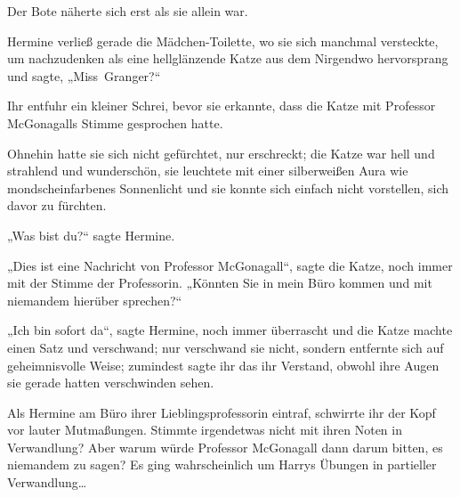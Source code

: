 
Der Bote näherte sich erst als sie allein war.

Hermine verließ gerade die Mädchen-Toilette, wo sie sich manchmal versteckte, um nachzudenken als eine hellglänzende Katze aus dem Nirgendwo hervorsprang und sagte, „Miss~Granger?“

Ihr entfuhr ein kleiner Schrei, bevor sie erkannte, dass die Katze mit Professor McGonagalls Stimme gesprochen hatte.

Ohnehin hatte sie sich nicht gefürchtet, nur erschreckt; die Katze war hell und strahlend und wunderschön, sie leuchtete mit einer silberweißen Aura wie mondscheinfarbenes Sonnenlicht und sie konnte sich einfach nicht vorstellen, sich davor zu fürchten.

„Was bist du?“ sagte Hermine.

„Dies ist eine Nachricht von Professor McGonagall“, sagte die Katze, noch immer mit der Stimme der Professorin. „Könnten Sie in mein Büro kommen und mit niemandem hierüber sprechen?“

„Ich bin sofort da“, sagte Hermine, noch immer überrascht und die Katze machte einen Satz und verschwand; nur verschwand sie nicht, sondern entfernte sich auf geheimnisvolle Weise; zumindest sagte ihr das ihr Verstand, obwohl ihre Augen sie gerade hatten verschwinden sehen.

Als Hermine am Büro ihrer Lieblingsprofessorin eintraf, schwirrte ihr der Kopf vor lauter Mutmaßungen. Stimmte irgendetwas nicht mit ihren Noten in Verwandlung? Aber warum würde Professor McGonagall dann darum bitten, es niemandem zu sagen? Es ging wahrscheinlich um Harrys Übungen in partieller Verwandlung…

